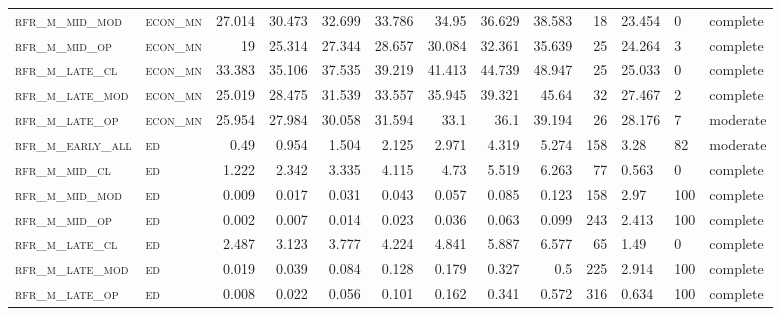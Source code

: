 \begin{landscape}
\begin{center}
\begin{longtable}{llrrrrr|rrr}
\textsc{rfr\_m\_mid\_mod  } & \textsc{econ\_mn  }   & 27.014  & 30.473  & 32.699  & 33.786   & 34.95    & 36.629   & 38.583   & 18     & 23.454        & 0             & complete           \\
\textsc{rfr\_m\_mid\_op   } & \textsc{econ\_mn  }   & 19      & 25.314  & 27.344  & 28.657   & 30.084   & 32.361   & 35.639   & 25     & 24.264        & 3             & complete       \\
\textsc{rfr\_m\_late\_cl  } & \textsc{econ\_mn  }   & 33.383  & 35.106  & 37.535  & 39.219   & 41.413   & 44.739   & 48.947   & 25     & 25.033        & 0             & complete           \\
\textsc{rfr\_m\_late\_mod } & \textsc{econ\_mn  }   & 25.019  & 28.475  & 31.539  & 33.557   & 35.945   & 39.321   & 45.64    & 32     & 27.467        & 2             & complete       \\
\textsc{rfr\_m\_late\_op  } & \textsc{econ\_mn  }   & 25.954  & 27.984  & 30.058  & 31.594   & 33.1     & 36.1     & 39.194   & 26     & 28.176        & 7             & moderate       \\
\textsc{rfr\_m\_early\_all} & \textsc{ed        }   & 0.49    & 0.954   & 1.504   & 2.125    & 2.971    & 4.319    & 5.274    & 158    & 3.28          & 82            & moderate       \\
\textsc{rfr\_m\_mid\_cl   } & \textsc{ed        }   & 1.222   & 2.342   & 3.335   & 4.115    & 4.73     & 5.519    & 6.263    & 77     & 0.563         & 0             & complete           \\
\textsc{rfr\_m\_mid\_mod  } & \textsc{ed        }   & 0.009   & 0.017   & 0.031   & 0.043    & 0.057    & 0.085    & 0.123    & 158    & 2.97          & 100           & complete       \\
\textsc{rfr\_m\_mid\_op   } & \textsc{ed        }   & 0.002   & 0.007   & 0.014   & 0.023    & 0.036    & 0.063    & 0.099    & 243    & 2.413         & 100           & complete       \\
\textsc{rfr\_m\_late\_cl  } & \textsc{ed        }   & 2.487   & 3.123   & 3.777   & 4.224    & 4.841    & 5.887    & 6.577    & 65     & 1.49          & 0             & complete           \\
\textsc{rfr\_m\_late\_mod } & \textsc{ed        }   & 0.019   & 0.039   & 0.084   & 0.128    & 0.179    & 0.327    & 0.5      & 225    & 2.914         & 100           & complete       \\
\textsc{rfr\_m\_late\_op  } & \textsc{ed        }   & 0.008   & 0.022   & 0.056   & 0.101    & 0.162    & 0.341    & 0.572    & 316    & 0.634         & 100           & complete       \\

\end{longtable}
\end{center}
\end{landscape}
